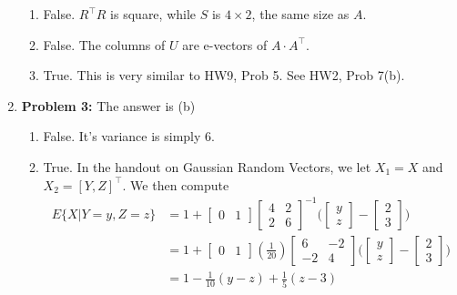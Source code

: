 \documentclass[letterpaper]{article}
\begin{document}
\begin{enumerate}
\begin{enumerate}
\item False. $R^\top R$ is square, while $S$ is $4 \times 2$, the same size as $A$.

\item False. The columns of $U$ are e-vectors of $A\cdot A^\top$.

\item True. This is very similar to HW9, Prob 5. See HW2, Prob 7(b).
\end{enumerate}

\item \noindent \textbf{Problem 3:}
The answer is (b)
\begin{enumerate}
\setlength{\itemsep}{.1in}
\renewcommand{\labelenumi}{(\alph{enumi})}
\item False. It's variance is simply 6.

\item True. In the handout on Gaussian Random Vectors, we let $X_1 = X$ and $X_2 = [Y, Z]^\top$. We then compute
$$\begin{aligned}E\{X|Y=y, Z=z\} &= 1 + \left[\begin{array}{cc} 0& 1\end{array}\right]\left[\begin{array}{cc} 4 & 2 \\ 2 & 6 \end{array}\right]^{-1}\Big(\begin{bmatrix} y \\ z \end{bmatrix} - \begin{bmatrix} 2 \\ 3 \end{bmatrix}\Big)\\
&= 1 + \left[\begin{array}{cc} 0& 1\end{array}\right](\frac{1}{20})\left[\begin{array}{cc} 6 & -2 \\ -2 & 4 \end{array}\right]\Big(\begin{bmatrix} y \\ z \end{bmatrix} - \begin{bmatrix} 2 \\ 3 \end{bmatrix}\Big)\\
&= 1 - \frac{1}{10}(y - z) + \frac{1}{5}(z - 3)
\end{aligned}$$


\end{enumerate}
\end{enumerate}
\end{document}
